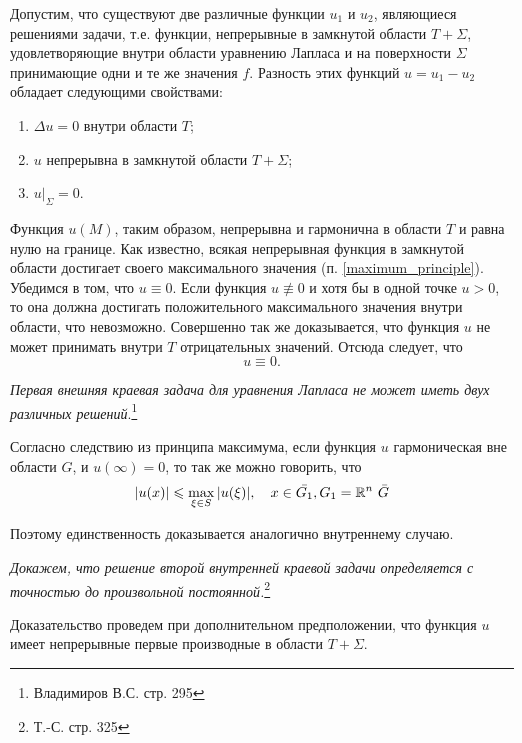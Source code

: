 Допустим, что существуют две различные функции $u_1$ и $u_2$, являющиеся решениями задачи, т.е. функции, непрерывные в замкнутой области $T + \Sigma$, удовлетворяющие внутри области уравнению Лапласа и на поверхности $\Sigma$ принимающие одни и те же значения $f$. Разность этих функций $u = u_1 - u_2$ обладает следующими свойствами:
\begin{enumerate}
	\item $\Delta u = 0$ внутри области $T$;
	
	\item $u$ непрерывна в замкнутой области $T + \Sigma$;
	
	\item $u|_{\Sigma} = 0.$
\end{enumerate}

Функция $u(M)$, таким образом, непрерывна и гармонична в области $T$ и равна нулю на границе. Как известно, всякая непрерывная функция в замкнутой области достигает своего максимального значения (п. \ref{maximum_principle}). Убедимся в том, что $u \equiv 0$. Если функция $u \not \equiv 0$ и хотя бы в одной точке $u > 0$, то она должна достигать положительного максимального значения внутри области, что невозможно. Совершенно так же доказывается, что функция $u$ не может принимать внутри $T$ отрицательных значений. Отсюда следует, что 
\begin{equation*}
	u \equiv 0.
\end{equation*}

\textit{Первая внешняя краевая задача для уравнения Лапласа не может иметь двух различных решений}.\footnote{Владимиров В.С. стр. 295}

Согласно следствию из принципа максимума, если функция $u$ гармоническая вне области $G$, и $u(\infty) = 0$, то так же можно говорить, что 
\begin{equation*}
	\abs{u(x)} \leqslant \max\limits_{\xi \in S}{\abs{u(\xi)}}, \quad x \in \bar{G_1}, G_1 = \mathbb{R}^n \ \bar{G}  
\end{equation*}

Поэтому единственность доказывается аналогично внутреннему случаю. 

\textit{Докажем, что решение второй внутренней краевой задачи определяется с точностью до произвольной постоянной.}\footnote{Т.-С. стр. 325}

Доказательство проведем при дополнительном предположении, что функция $u$ имеет непрерывные первые производные в области $T + \Sigma$. 

